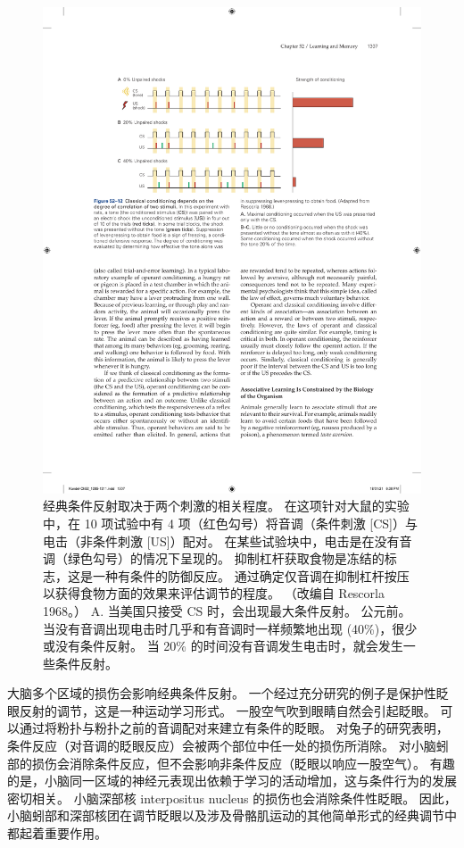 \begin{figure}[htbp]
	\centering
	\includegraphics[width=0.8\linewidth]{chap52/fig_52_12}
	\caption{经典条件反射取决于两个刺激的相关程度。 在这项针对大鼠的实验中，在 10 项试验中有 4 项（红色勾号）将音调（条件刺激 [CS]）与电击（非条件刺激 [US]）配对。 在某些试验块中，电击是在没有音调（绿色勾号）的情况下呈现的。 抑制杠杆获取食物是冻结的标志，这是一种有条件的防御反应。 通过确定仅音调在抑制杠杆按压以获得食物方面的效果来评估调节的程度。 （改编自 Rescorla 1968。） A. 当美国只接受 CS 时，会出现最大条件反射。 公元前。 当没有音调出现电击时几乎和有音调时一样频繁地出现 (40\%)，很少或没有条件反射。 当 20\% 的时间没有音调发生电击时，就会发生一些条件反射。}
	\label{fig:52_12}
\end{figure}

大脑多个区域的损伤会影响经典条件反射。 一个经过充分研究的例子是保护性眨眼反射的调节，这是一种运动学习形式。 一股空气吹到眼睛自然会引起眨眼。 可以通过将粉扑与粉扑之前的音调配对来建立有条件的眨眼。 对兔子的研究表明，条件反应（对音调的眨眼反应）会被两个部位中任一处的损伤所消除。 对小脑蚓部的损伤会消除条件反应，但不会影响非条件反应（眨眼以响应一股空气）。 有趣的是，小脑同一区域的神经元表现出依赖于学习的活动增加，这与条件行为的发展密切相关。 小脑深部核 interpositus nucleus 的损伤也会消除条件性眨眼。 因此，小脑蚓部和深部核团在调节眨眼以及涉及骨骼肌运动的其他简单形式的经典调节中都起着重要作用。

